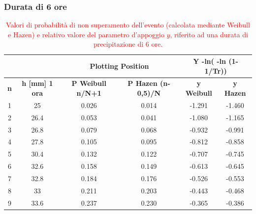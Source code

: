 \subsubsection{Durata di 6 ore}
\begin{table}[H] \centering
    \caption{\textcolor{red}{Valori di probabilità di non superamento dell'evento (calcolata mediante Weibull e Hazen) e relativo valore del parametro d'appoggio $y$, riferito ad una durata di precipitazione di 6 ore.}}
\begin{tabular}{cccccc}
        &  & \multicolumn{2}{c}{\textbf{Plotting Position}} & \multicolumn{2}{c}{\textbf{Y -ln( -ln (1- 1/Tr))}}\\
        \toprule
           \textbf{n} & \textbf{h [mm] 1 ora} & \textbf{P Weibull   n/N+1} & \textbf{P Hazen  (n-0,5)/N} & \textbf{y Weibull} & \textbf{y Hazen}\\
       \midrule 
    1          & 25                          & 0.026                      & 0.014                       & -1.291                  & -1.460                  \\
    2          & 26.4                        & 0.053                      & 0.041                       & -1.080                  & -1.165                  \\
    3          & 26.8                        & 0.079                      & 0.068                       & -0.932                  & -0.991                  \\
    4          & 27.8                        & 0.105                      & 0.095                       & -0.812                  & -0.858                  \\
    5          & 30.4                        & 0.132                      & 0.122                       & -0.707                  & -0.745                  \\
    6          & 32.6                        & 0.158                      & 0.149                       & -0.613                  & -0.645                  \\
    7          & 32.8                        & 0.184                      & 0.176                       & -0.526                  & -0.553                  \\
    8          & 33                          & 0.211                      & 0.203                       & -0.443                  & -0.468                  \\
    9          & 33.6                        & 0.237                      & 0.230                       & -0.365                  & -0.386                  \\

\end{tabular}
\end{table}
